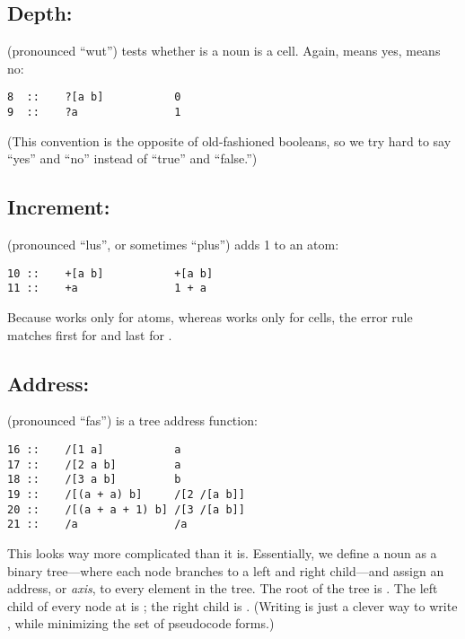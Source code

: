 \subsection{Depth: }

 (pronounced ``wut'') tests whether is a noun is a cell.  Again,
 means yes,  means no:

\begin{framed_shaded}
\begin{Verbatim}[fontsize=\relsize{-2.5},fontseries=b,commandchars=\\\{\}]
8  ::    ?[a b]           0
9  ::    ?a               1
\end{Verbatim}
\end{framed_shaded}
(This convention is the opposite of old-fashioned booleans, so we
try hard to say ``yes'' and ``no'' instead of ``true'' and ``false.'')

\subsection{Increment: \kode{+}}

\kode{+} (pronounced ``lus'', or sometimes ``plus'') adds 1 to an atom:

\begin{framed_shaded}
\begin{Verbatim}[fontsize=\relsize{-2.5},fontseries=b,commandchars=\\\{\}]
10 ::    +[a b]           +[a b]
11 ::    +a               1 + a
\end{Verbatim}
\end{framed_shaded}
Because \kode{+} works only for atoms, whereas \kode{=} works only for
cells, the error rule matches first for \kode{+} and last for \kode{=}.

\subsection{Address: \kode{/}}

\kode{/} (pronounced ``fas'') is a tree address function:

\begin{framed_shaded}
\begin{Verbatim}[fontsize=\relsize{-2.5},fontseries=b,commandchars=\\\{\}]
16 ::    /[1 a]           a
17 ::    /[2 a b]         a
18 ::    /[3 a b]         b
19 ::    /[(a + a) b]     /[2 /[a b]]
20 ::    /[(a + a + 1) b] /[3 /[a b]]
21 ::    /a               /a
\end{Verbatim}
\end{framed_shaded}
This looks way more complicated than it is.  Essentially, we define a
noun as a binary tree---where each node branches to a left and right
child---and assign an address, or \emph{axis}, to every element in the
tree.  The root of the tree is .  The left child of
every node at  is ; the right child is .  (Writing  is just a clever way to write , while minimizing the set of
pseudocode forms.)

